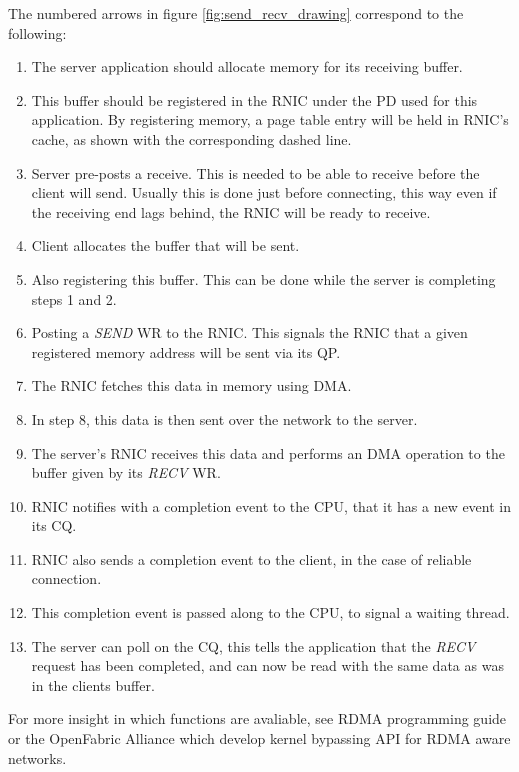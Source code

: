 The numbered arrows in figure \ref{fig:send_recv_drawing} correspond to the following:

\begin{enumerate}
    \item The server application should allocate memory for its receiving buffer.
    \item This buffer should be registered in the RNIC under the PD used for this application.
    By registering memory, a page table entry will be held in RNIC's cache, as shown with the corresponding dashed line.
    \item Server pre-posts a receive.
    This is needed to be able to receive before the client will send.
    Usually this is done just before connecting, this way even if the receiving end lags behind, the RNIC will be ready to receive.
    \item Client allocates the buffer that will be sent.
    \item Also registering this buffer.
    This can be done while the server is completing steps 1 and 2.
    \item Posting a \textit{SEND} WR to the RNIC.
    This signals the RNIC that a given registered memory address will be sent via its QP.
    \item The RNIC fetches this data in memory using DMA.
    \item In step 8, this data is then sent over the network to the server.
    \item The server's RNIC receives this data and performs an DMA operation to the buffer given by its \textit{RECV} WR.
    \item RNIC notifies with a completion event to the CPU, that it has a new event in its CQ.
    \item RNIC also sends a completion event to the client, in the case of reliable connection.
    \item This completion event is passed along to the CPU, to signal a waiting thread.
    \item The server can poll on the CQ, this tells the application that the \textit{RECV} request has been completed, and can now be read with the same data as was in the clients buffer.
\end{enumerate}

For more insight in which functions are avaliable, see RDMA programming guide\cite{mellanox_prog_guide} or the OpenFabric Alliance\cite{openfab} which develop kernel bypassing API for RDMA aware networks.
